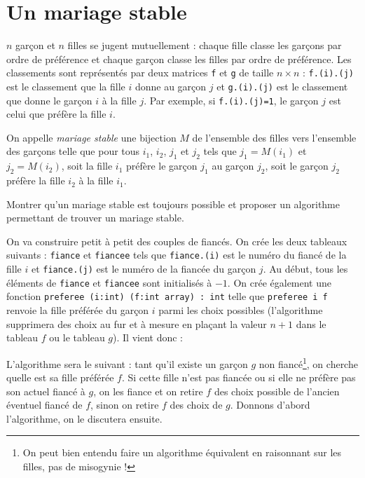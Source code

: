 \renewcommand{\SourceFile}{5-graphes/src/5-3.ml}

\section{Un mariage stable}

$n$ garçon et $n$ filles se jugent mutuellement : chaque fille classe les garçons par ordre de préférence et chaque garçon classe les filles par ordre de préférence. Les classements sont représentés par deux matrices \texttt{f} et \texttt{g} de taille $n \times n$ : \texttt{f.(i).(j)} est le classement que la fille $i$ donne au garçon $j$ et \texttt{g.(i).(j)} est le classement que donne le garçon $i$ à la fille $j$. Par exemple, si \texttt{f.(i).(j)=1}, le garçon $j$ est celui que préfère la fille $i$.
\medskip

On appelle \textit{mariage stable} une bijection $M$ de l'ensemble des filles vers l'ensemble des garçons telle que pour tous $i_1$, $i_2$, $j_1$ et $j_2$ tels que $j_1 = M(i_1)$ et $j_2 = M(i_2)$, soit la fille $i_1$ préfère le garçon $j_1$ au garçon $j_2$, soit le garçon $j_2$ préfère la fille $i_2$ à la fille $i_1$.

\Q
Montrer qu'un mariage stable est toujours possible et proposer un algorithme permettant de trouver un mariage stable.

\Corrige

\Q
On va construire petit à petit des couples de fiancés. On crée les deux tableaux suivants : \texttt{fiance} et \texttt{fiancee} tels que \texttt{fiance.(i)} est le numéro du fiancé de la fille $i$ et \texttt{fiance.(j)} est le numéro de la fiancée du garçon $j$. Au début, tous les éléments de \texttt{fiance} et \texttt{fiancee} sont initialisés à $-1$. On crée également une fonction \texttt{preferee (i:int) (f:int array) : int} telle que \texttt{preferee i f} renvoie la fille préférée du garçon $i$ parmi les choix possibles (l'algorithme supprimera des choix au fur et à mesure en plaçant la valeur $n+1$ dans le tableau $f$ ou le tableau $g$). Il vient donc :



L'algorithme sera le suivant : tant qu'il existe un garçon $g$ non fiancé\footnote{On peut bien entendu faire un algorithme équivalent en raisonnant sur les filles, pas de misogynie !}, on cherche quelle est sa fille préférée $f$. Si cette fille n'est pas fiancée ou si elle ne préfère pas son actuel fiancé à $g$, on les fiance et on retire $f$ des choix possible de l'ancien éventuel fiancé de $f$, sinon on retire $f$ des choix de $g$. Donnons d'abord l'algorithme, on le discutera ensuite.


